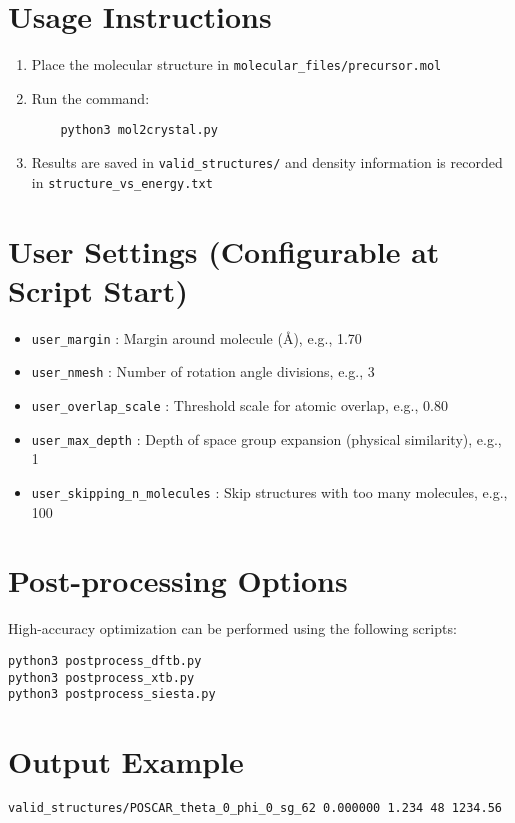 \documentclass[12pt]{article}
\begin{document}
\section{Usage Instructions}
\begin{enumerate}
    \item Place the molecular structure in \texttt{molecular\_files/precursor.mol}
    \item Run the command:
    \begin{verbatim}
    python3 mol2crystal.py
    \end{verbatim}
    \item Results are saved in \texttt{valid\_structures/} and density information is recorded in \texttt{structure\_vs\_energy.txt}
\end{enumerate}

\section{User Settings (Configurable at Script Start)}
\begin{itemize}
    \item \texttt{user\_margin} : Margin around molecule (Å), e.g., 1.70
    \item \texttt{user\_nmesh} : Number of rotation angle divisions, e.g., 3
    \item \texttt{user\_overlap\_scale} : Threshold scale for atomic overlap, e.g., 0.80
    \item \texttt{user\_max\_depth} : Depth of space group expansion (physical similarity), e.g., 1
    \item \texttt{user\_skipping\_n\_molecules} : Skip structures with too many molecules, e.g., 100
\end{itemize}

\section{Post-processing Options}
High-accuracy optimization can be performed using the following scripts:
\begin{verbatim}
python3 postprocess_dftb.py
python3 postprocess_xtb.py
python3 postprocess_siesta.py
\end{verbatim}

\section{Output Example}
\begin{verbatim}
valid_structures/POSCAR_theta_0_phi_0_sg_62 0.000000 1.234 48 1234.56
\end{verbatim}
\end{document}
